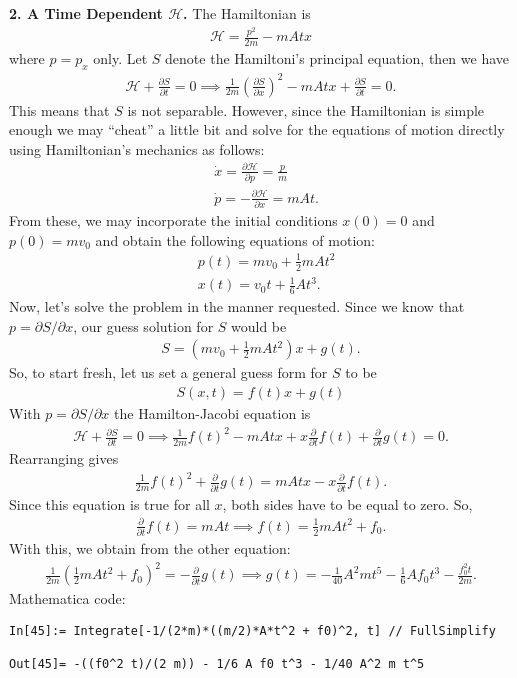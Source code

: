 \documentclass{article}
\theoremstyle{definition}
\newcommand{\p}{\partial}
\newcommand{\ham}{\mathcal{H}}
\newcommand{\f}[2]{\frac{#1}{#2}}
\newcommand{\lp}{\left(}
\newcommand{\rp}{\right)}
\begin{document}
\noindent \textbf{2. A Time Dependent $\ham$.} The Hamiltonian is 
\begin{align*}
\ham = \f{p^2}{2m} - mAtx
\end{align*}
where $p = p_x$ only. Let $S$ denote the Hamiltoni's principal equation, then we have
\begin{align*}
\ham + \f{\p S}{\p t} = 0 \implies \f{1}{2m}\lp \f{\p S}{\p x} \rp^2 - mAtx + \f{\p S}{\p t} = 0.
\end{align*}
This means that $S$ is not separable. However, since the Hamiltonian is simple enough we may ``cheat'' a little bit and solve for the equations of motion directly using Hamiltonian's mechanics as follows:
\begin{align*}
&\dot x = \f{\p \ham}{\p p} = \f{p}{m}\\
&\dot p = -\f{\p \ham }{\p x} = mAt. 
\end{align*}
From these, we may incorporate the initial conditions $x(0) = 0$ and $p(0) = mv_0$ and obtain the following equations of motion:
\begin{align*}
&p(t)= mv_0 + \f{1}{2}mAt^2 \\
&x(t)= v_0t + \f{1}{6}At^3.
\end{align*}
Now, let's solve the problem in the manner requested. Since we know that $p = \p S/ \p x$, our guess solution for $S$ would be 
\begin{align*}
S= \lp mv_0 + \f{1}{2}mAt^2\rp x + g(t).
\end{align*}
So, to start fresh, let us set a general guess form for $S$ to be
\begin{align*}
\boxed{S(x,t) = f(t) x + g(t)}
\end{align*}
With $p = \p S/\p x$ the Hamilton-Jacobi equation is 
\begin{align*}
\ham + \f{\p S}{\p t} = 0 \implies \f{1}{2m} f(t)^2 - mA t x +  x\f{\p}{\p t} f(t)   + \f{\p}{\p t} g(t) = 0.
\end{align*}
Rearranging gives
\begin{align*}
\f{1}{2m}f(t)^2 + \f{\p}{\p t}g(t) = mAtx - x \f{\p}{\p t}f(t).
\end{align*}
Since this equation is true for all $x$, both sides have to be equal to zero. So,
\begin{align*}
\f{\p}{\p t}f(t) = mAt \implies f(t) = \f{1}{2}mAt^2 + f_0. 
\end{align*}
With this, we obtain from the other equation:
\begin{align*}
\f{1}{2m} \lp \f{1}{2}mAt^2 + f_0 \rp^2 = -\f{\p}{\p t}g(t)\implies g(t)
 = -\f{1}{40}A^2 mt^5 - \f{1}{6}A f_0 t^3 - \f{f_0^2 t}{2m}.
\end{align*}
Mathematica code:
\begin{lstlisting}
In[45]:= Integrate[-1/(2*m)*((m/2)*A*t^2 + f0)^2, t] // FullSimplify

Out[45]= -((f0^2 t)/(2 m)) - 1/6 A f0 t^3 - 1/40 A^2 m t^5
\end{lstlisting}
\end{document}
